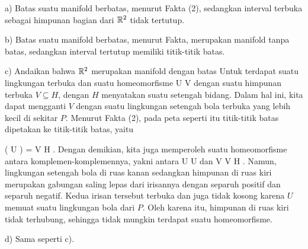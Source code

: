 a) Batas
 suatu manifold berbatas, menurut
Fakta (2),
sedangkan interval terbuka sebagai himpunan bagian dari ${\mathbb R}^2$ tidak tertutup.

b) Batas
 suatu manifold berbatas, menurut
Fakta,
merupakan manifold tanpa batas, sedangkan interval tertutup memiliki titik-titik batas.

c) Andaikan bahwa ${\mathbb R}^2$ merupakan manifold dengan batas
 Untuk
 terdapat suatu lingkungan terbuka
 dan suatu homeomorfisme
\maabbdisp {\alpha} { U } {V
} {}
dengan suatu himpunan terbuka $V \subseteq H$, dengan $H$ menyatakan suatu setengah bidang. Dalam hal ini, kita dapat mengganti $V$ dengan suatu lingkungan setengah bola terbuka yang lebih kecil di sekitar $P$. Menurut
Fakta (2),
pada peta seperti itu titik-titik batas dipetakan ke titik-titik batas, yaitu

\mavergleichskettedisp
{\vergleichskette
{\alpha ( U \cap \R  )
}
{ =} { V \cap \partial H
}
{ } {
}
{ } {
}
{ } {
}
}
{}{}{.}
Dengan demikian, kita juga memperoleh suatu homeomorfisme antara komplemen-komplemennya, yakni antara
\mathkor {} {U \setminus U \cap \R} {dan} {V \setminus V \cap \partial H} {.}
Namun, lingkungan setengah bola di ruas kanan
sedangkan himpunan di ruas kiri merupakan gabungan saling lepas dari irisannya dengan separuh positif dan separuh negatif. Kedua irisan tersebut terbuka dan juga tidak kosong karena $U$ memuat suatu lingkungan bola dari $P$. Oleh karena itu, himpunan di ruas kiri tidak terhubung, sehingga tidak mungkin terdapat suatu homeomorfisme.

d) Sama seperti c).
